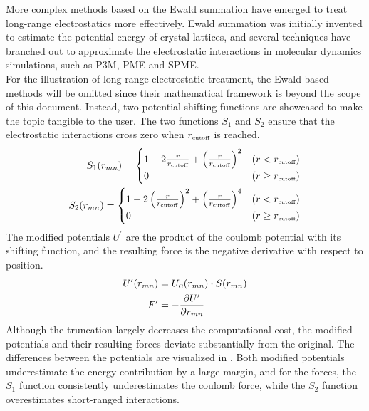 \documentclass[9pt,tutorial]{livecoms}
\begin{document}
More complex methods based on the Ewald summation have emerged to treat long-range electrostatics more effectively. Ewald summation was initially invented to estimate the potential energy of crystal lattices\cite{Ewald1921}, and several techniques have branched out to approximate the electrostatic interactions in molecular dynamics simulations, such as P3M\cite{Hockney2021}, PME\cite{Darden1993} and SPME\cite{Essmann1995}.\\
For the illustration of long-range electrostatic treatment, the Ewald-based methods will be omitted since their mathematical framework is beyond the scope of this document. Instead, two potential shifting functions are showcased to make the topic tangible to the user. The two functions $S_1$ and $S_2$ ensure that the electrostatic interactions cross zero when $r_\text{\tiny cutoff}$ is reached.\cite{Prevost1990}
\begin{align} \label{eq:truncationPotSwitch}
S_{1}(r_{mn}) = 
\begin{cases}
  1 - 2 \frac{r}{r_\text{\tiny cutoff}} + \left( \frac{r}{r_\text{\tiny cutoff}} \right)^2  &  (r < r_\text{\tiny cutoff})\\
  0 & (r \geq r_\text{\tiny cutoff}) \\
\end{cases}\\
S_{2}(r_{mn}) = 
\begin{cases}
  1 - 2 \left(\frac{r}{r_\text{\tiny cutoff}}\right)^2 + \left( \frac{r}{r_\text{\tiny cutoff}} \right)^4  &  (r < r_\text{\tiny cutoff})\\
  0 & (r \geq r_\text{\tiny cutoff}) \\
\end{cases}
\end{align}
The modified potentials $U^\prime$ are the product of the coulomb potential with its shifting function, and the resulting force is the negative derivative with respect to position.
\begin{align}
    U^\prime(r_{mn}) &= U_\text{\tiny C}(r_{mn}) \cdot S(r_{mn}) \\
    F^\prime &= -\frac{\partial U^\prime}{\partial r_{mn}}
\end{align}
Although the truncation largely decreases the computational cost, the modified potentials and their resulting forces deviate substantially from the original. The differences between the potentials are visualized in . Both modified potentials underestimate the energy contribution by a large margin, and for the forces, the $S_1$ function consistently underestimates the coulomb force, while the $S_2$ function overestimates short-ranged interactions. 
\end{document}

